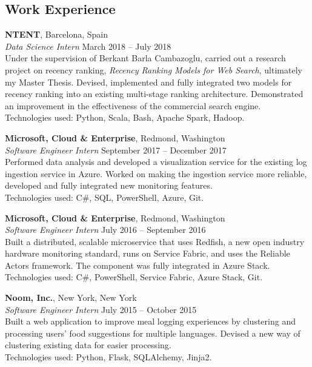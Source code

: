 \documentclass[margin,line]{resume}
\begin{document}
\begin{resume}
\vspace{-1mm}
\section{\mysidestyle Work Experience}

\textbf{NTENT}, Barcelona, Spain \vspace{1mm}\\\vspace{1mm}%
\textsl{Data Science Intern} \hfill March 2018 -- July 2018\\%
Under the supervision of Berkant Barla Cambazoglu, carried out a research project on recency ranking, \textit{Recency Ranking Models for Web Search}, ultimately my Master Thesis. Devised, implemented and fully integrated two models for recency ranking into an existing multi-stage ranking architecture. Demonstrated an improvement in the effectiveness of the commercial search engine. \\
Technologies used: Python, Scala, Bash, Apache Spark, Hadoop.

\textbf{Microsoft, Cloud \& Enterprise}, Redmond, Washington \vspace{1mm}\\\vspace{1mm}%
\textsl{Software Engineer Intern} \hfill September 2017 -- December 2017\\%
Performed data analysis and developed a visualization service for the existing log ingestion service in Azure. Worked on making the ingestion service more reliable, developed and fully integrated new monitoring features. \\
Technologies used: C\#, SQL, PowerShell, Azure, Git.

\textbf{Microsoft, Cloud \& Enterprise}, Redmond, Washington \vspace{1mm}\\\vspace{1mm}%
\textsl{Software Engineer Intern} \hfill July 2016 -- September 2016\\%
Built a distributed, scalable microservice that uses Redfish, a new open industry hardware monitoring standard, runs on Service Fabric, and uses the Reliable Actors framework. The component was fully integrated in Azure Stack. \\
Technologies used: C\#, PowerShell, Service Fabric, Azure Stack, Git.

\textbf{Noom, Inc.}, New York, New York \vspace{1mm}\\\vspace{1mm}%
\textsl{Software Engineer Intern} \hfill July 2015 -- October 2015\\%
Built a web application to improve meal logging experiences by clustering and processing users' food suggestions for multiple languages. Devised a new way of clustering existing data for easier processing. \\
Technologies used: Python, Flask, SQLAlchemy, Jinja2.


\end{resume}
\end{document}

